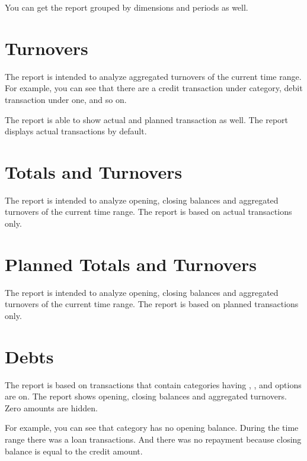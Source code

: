 \documentclass[a4paper,10pt,english]{sphinxmanual}
\begin{document}
You can get the report grouped by dimensions and periods as well.


\section{Turnovers}
\label{\detokenize{reports:turnovers}}
The report is intended to analyze aggregated turnovers of the current time range.
For example, you can see that there are a credit transaction under  category,
debit transaction under  one, and so on.

The report is able to show actual and planned transaction as well. The report displays actual transactions
by default.


\section{Totals and Turnovers}
\label{\detokenize{reports:totals-and-turnovers}}
The report is intended to analyze opening, closing balances and aggregated turnovers of the current time range.
The report is based on actual transactions only.

\noindent{}
\noindent{}
\noindent{}


\section{Planned Totals and Turnovers}
\label{\detokenize{reports:planned-totals-and-turnovers}}
The report is intended to analyze opening, closing balances and aggregated turnovers of the current time range.
The report is based on planned transactions only.


\section{Debts}
\label{\detokenize{reports:debts}}
The report is based on transactions that contain categories having ,
, and  options are on. The report
shows opening, closing balances and aggregated turnovers. Zero amounts are hidden.

For example, you can see that  category has no opening balance.
During the time range there was a loan transactions. And there was no repayment because
closing balance is equal to the credit amount.
\end{document}
